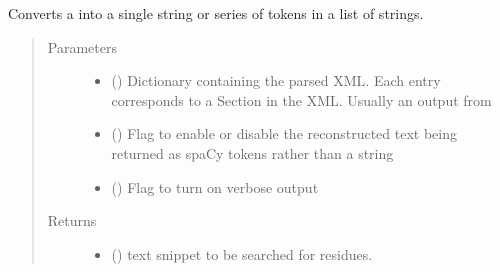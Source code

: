 \documentclass[letterpaper,10pt,english]{sphinxmanual}
\begin{document}
\begin{fulllineitems}
\label{\detokenize{functions:pyresid.reconstruct_fulltext}}
Converts a  into a single string or series of tokens in a list of strings.
\begin{quote}\begin{description}
\item[{Parameters}] \leavevmode\begin{itemize}
\item {} 
 () \textendash{} Dictionary containing the parsed XML. Each entry corresponds to a Section
in the XML. Usually an output from {\hyperref[\detokenize{functions:pyresid.get_sections_text}]{}}

\item {} 
 (\sphinxstyleliteralemphasis{\sphinxupquote{, }}\sphinxstyleliteralemphasis{\sphinxupquote{, }}) \textendash{} Flag to enable or disable the reconstructed text being returned as spaCy tokens
rather than a string

\item {} 
 (\sphinxstyleliteralemphasis{\sphinxupquote{, }}\sphinxstyleliteralemphasis{\sphinxupquote{, }}) \textendash{} Flag to turn on verbose output

\end{itemize}

\item[{Returns}] \leavevmode
\begin{itemize}
\item {} 
 () \textendash{} text snippet to be searched for residues.


\end{itemize}
\end{description}
\end{quote}
\end{fulllineitems}
\end{document}
